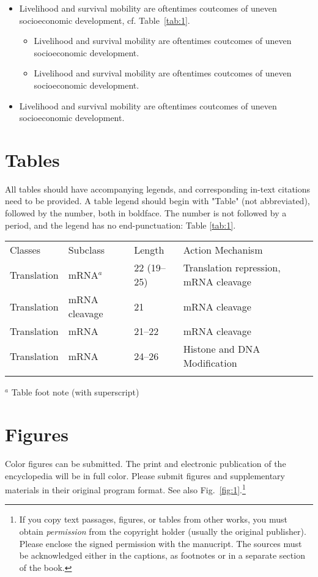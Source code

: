 \documentclass[graybox, natbib, nosecnum, twocolumn]{svmult}
\begin{document}
{\begin{itemize}
\item{Livelihood and survival mobility are oftentimes coutcomes of uneven socioeconomic development, cf. Table~\ref{tab:1}.}
\begin{itemize}
\item{Livelihood and survival mobility are oftentimes coutcomes of uneven socioeconomic development.}
\item{Livelihood and survival mobility are oftentimes coutcomes of uneven socioeconomic development.}
\end{itemize}
\item{Livelihood and survival mobility are oftentimes coutcomes of uneven socioeconomic development.}
\end{itemize}

\section{Tables}
All tables should have accompanying legends, and corresponding in-text citations need to be provided. A table legend should begin with "Table" (not abbreviated), followed by the number, both in boldface.
The number is not followed by a period, and the legend has no end-punctuation: Table \ref{tab:1}.
%
\begin{table*}
\caption{Please write your table caption here}
\label{tab:1}       %
%
%
\begin{tabular}{p{2cm}p{2.4cm}p{2cm}p{4.9cm}}
\hline\noalign{\smallskip}
Classes & Subclass & Length & Action Mechanism  \\
\noalign{\smallskip}\svhline\noalign{\smallskip}
Translation & mRNA$^a$  & 22 (19--25) & Translation repression, mRNA cleavage\\
Translation & mRNA cleavage & 21 & mRNA cleavage\\
Translation & mRNA  & 21--22 & mRNA cleavage\\
Translation & mRNA  & 24--26 & Histone and DNA Modification\\
\noalign{\smallskip}\hline\noalign{\smallskip}
\end{tabular}
$^a$ Table foot note (with superscript)
\end{table*}
%
\section{Figures}
Color figures can be submitted. The print and electronic publication of the encyclopedia will be in full color. Please submit figures and supplementary materials in their original program format. See also Fig.~\ref{fig:1}.\footnote{If you copy
text passages, figures, or tables from other works, you must obtain
\textit{permission} from the copyright holder (usually the original
publisher). Please enclose the signed permission with the manucript. The
sources must be acknowledged either in the
captions, as footnotes or in a separate section of the book.}


}
\end{document}
